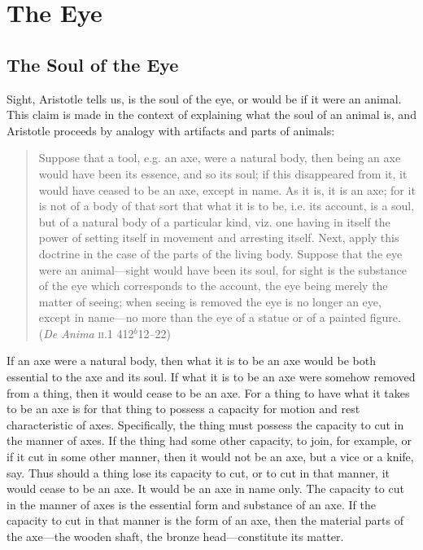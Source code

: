 \chapter{The Eye} %
\label{cha:the_eye}

\section{The Soul of the Eye} %
\label{sec:the_soul_of_the_eye}

Sight, Aristotle tells us, is the soul of the eye, or would be if it were an animal. This claim is made in the context of explaining what the soul of an animal is, and Aristotle proceeds by analogy with artifacts and parts of animals:
\begin{quote}
	Suppose that a tool, e.g. an axe, were a natural body, then being an axe would have been its essence, and so its soul; if this disappeared from it, it would have ceased to be an axe, except in name. As it is, it is an axe; for it is not of a body of that sort that what it is to be, i.e. its account, is a soul, but of a natural body of a particular kind, viz. one having in itself the power of setting itself in movement and arresting itself. Next, apply this doctrine in the case of the parts of the living body. Suppose that the eye were an animal—sight would have been its soul, for sight is the substance of the eye which corresponds to the account, the eye being merely the matter of seeing; when seeing is removed the eye is no longer an eye, except in name—no more than the eye of a statue or of a painted figure. (\emph{De Anima} \textsc{ii}.1 412\( ^{b} \)12--22)
\end{quote}

If an axe were a natural body, then what it is to be an axe would be both essential to the axe and its soul. If what it is to be an axe were somehow removed from a thing, then it would cease to be an axe. For a thing to have what it takes to be an axe is for that thing to possess a capacity for motion and rest characteristic of axes. Specifically, the thing must possess the capacity to cut in the manner of axes. If the thing had some other capacity, to join, for example, or if it cut in some other manner, then it would not be an axe, but a vice or a knife, say. Thus should a thing lose its capacity to cut, or to cut in that manner, it would cease to be an axe. It would be an axe in name only. The capacity to cut in the manner of axes is the essential form and substance of an axe. If the capacity to cut in that manner is the form of an axe, then the material parts of the axe---the wooden shaft, the bronze head---constitute its matter. 

